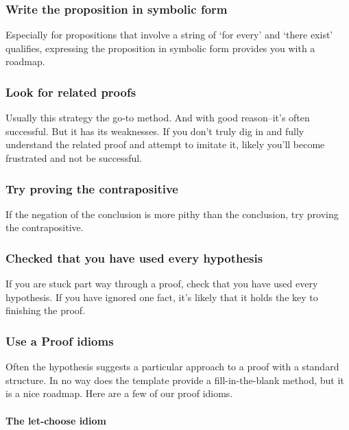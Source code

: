 \documentclass[12pt,fleqn]{article}
\newcounter{ex}\setcounter{ex}{0}
\newcounter{id}\setcounter{id}{0}
\newcounter{se}\setcounter{se}{0}
\begin{document}
 \subsubsection{Write the proposition in symbolic form} 
 
 Especially for propositions 
 that involve a string of `for every' and `there exist' qualifies,
 expressing the proposition in symbolic form provides you with 
 a roadmap.

 \subsubsection{Look for related proofs} 
 
 Usually this strategy the go-to 
 method. And with good reason--it's often successful. But it has its 
 weaknesses. If you don't truly dig in and fully understand the related
 proof and attempt to imitate it, likely you'll become frustrated and 
 not be successful. 

 \subsubsection{Try proving the contrapositive} 
 
 If the negation of the conclusion is 
 more pithy than the conclusion, try proving the contrapositive.


 \subsubsection{Checked that you have used every hypothesis}

 If you are stuck part way through a proof, check that you have
 used every hypothesis.  If you have ignored one fact,  it's likely
 that it holds the key to finishing the proof.
 
 

\subsubsection{Use a  Proof idioms}

Often the hypothesis suggests a particular approach to a proof with a standard structure.  In no way does
the template provide a fill-in-the-blank method, but it is a nice roadmap.  Here are a few of our proof idioms.

\paragraph{The let-choose idiom}
\end{document}
